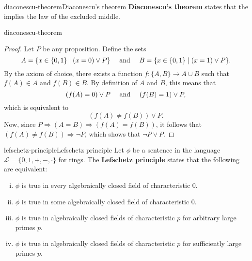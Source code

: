 \begin{topic}{diaconescu-theorem}{Diaconescu's theorem}
    \textbf{Diaconescu's theorem} states that the  implies the law of the excluded middle.
\end{topic}

\begin{example}{diaconescu-theorem}
    \begin{proof}
        Let $P$ be any proposition. Define the sets
        \[ A = \{ x \in \{ 0, 1 \} \mid (x = 0) \lor P \} \quad \textup{ and } \quad B = \{ x \in \{ 0, 1 \} \mid (x = 1) \lor P \} . \]
        By the axiom of choice, there exists a function $f : \{ A, B \} \to A \cup B$ such that $f(A) \in A$ and $f(B) \in B$. By definition of $A$ and $B$, this means that
        \[ (f(A) = 0) \lor P \quad \textup{ and } \quad (f(B) = 1) \lor P , \]
        which is equivalent to
        \[ (f(A) \ne f(B)) \lor P . \]
        Now, since $P \Rightarrow (A = B) \Rightarrow (f(A) = f(B))$, it follows that $(f(A) \ne f(B)) \Rightarrow \neg P$, which shows that $\neg P \lor P$.
    \end{proof}
\end{example}

\begin{topic}{lefschetz-principle}{Lefschetz principle}
    Let $\phi$ be a sentence in the language $\mathcal{L} = \{ 0, 1, +, -, \cdot \}$ for rings. The \textbf{Lefschetz principle} states that the following are equivalent:
    \begin{enumerate}[(i)]
        \item $\phi$ is true in every algebraically closed field of characteristic $0$.
        \item $\phi$ is true in some algebraically closed field of characteristic $0$.
        \item $\phi$ is true in algebraically closed fields of characteristic $p$ for arbitrary large primes $p$.
        \item $\phi$ is true in algebraically closed fields of characteristic $p$ for sufficiently large primes $p$.
    \end{enumerate}
\end{topic}
